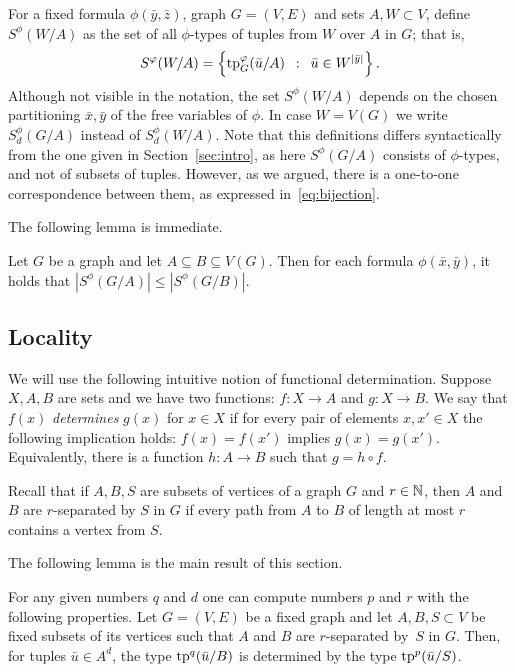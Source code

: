 For a fixed formula $\phi(\bar y,\bar z)$,  graph $G=(V,E)$ and sets $A,W\subset V$, define
 $S^\phi(W/A)$ as the set of all $\phi$-types of tuples from $W$ over $A$ in $G$; that is, 
\begin{equation*}
S^\varphi(W/A)=\left\{\mathrm{tp}^\varphi_G(\bar u/A) \,~:~\, \bar u\in W^{|\bar y|} \right\}.
\end{equation*}
Although not visible in the notation, the set $S^\phi(W/A)$ depends on the chosen partitioning $\bar x,\bar y$ of the free variables of $\phi$.
In case $W=V(G)$ we write $S^{\phi}_d(G/A)$ instead of $S^{\phi}_d(W/A)$.
Note that this definitions differs syntactically from the one given in Section~\ref{sec:intro}, as here $S^{\phi}(G/A)$ consists of $\phi$-types, and not of subsets of tuples.
However, as we argued, there is a one-to-one correspondence between them, as expressed in~\eqref{eq:bijection}.

The following lemma is immediate.
\begin{lemma}\label{lem:types-over-B}
Let $G$ be a graph and let $A\subseteq B\subseteq V(G)$. Then for each formula $\phi(\bar x,\bar y)$, it holds that
$|S^\phi(G/A)|\leq |S^\phi(G/B)|$. 
\end{lemma}

\subsection{Locality}
We will use the following intuitive notion of functional determination.
Suppose $X,A,B$ are sets and we have two functions: $f\colon X\to A$ and $g\colon X\to B$.
We say that $f(x)$ {\em{determines}} $g(x)$ for $x\in X$ if for every pair of elements $x,x'\in X$ the following implication holds: $f(x)=f(x')$ implies $g(x)=g(x')$.
Equivalently, there is a function $h\colon A\to B$ such that $g=h\circ f$.

Recall that if $A,B,S$ are subsets of vertices of a graph $G$ and $r\in\mathbb{N}$,
then $A$ and $B$ are $r$-separated by $S$ in $G$
if every path from $A$ to $B$ of length at most $r$ contains a vertex from $S$.

\medskip
The following lemma is the main result of this section. 

\begin{lemma}\label{lem:types}
For any given numbers $q$ and $d$
one can compute numbers $p$ and $r$ with the following properties.
Let $G=(V,E)$ be a fixed graph and let $A,B,S\subset V$ be fixed subsets of its vertices
such that $A$ and $B$ are $r$-separated by~$S$ in $G$.
Then, for tuples $\bar u\in A^{d}$, the type $\mathrm{tp}^q(\bar u/B)$ is determined by the type $\mathrm{tp}^{p}(\bar u/S)$.
\end{lemma}

